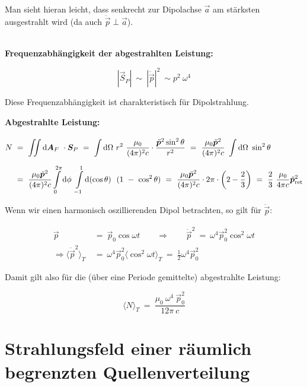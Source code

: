 Man sieht hieran leicht, dass senkrecht zur Dipolachse $\vec{a}$ am stärksten ausgestrahlt wird (da auch $\ddot{\vec{p}}\perp \vec{a}$).

\ \\
\textbf{Frequenzabhängigkeit der abgestrahlten Leistung:}

\begin{equation*}
|\vec{S}_P|  \ \sim \ |\ddot{\vec{p}}|^2 \ \sim p^2 \ \omega^4
\end{equation*}

Diese Frequenzabhängigkeit ist charakteristisch für Dipolstrahlung.

\newpage
\textbf{Abgestrahlte Leistung:}

\begin{align*}
N  \ &= \ \Iint{}{}{\vec{A}_F} \cdot \vec{S}_P  \ = \ \Int{}{}{\Omega}r^2 \ \frac{\mu_0}{(4\pi)^2c}\cdot\frac{\ddot{\vec{p}}^2\sin^2\theta}{r^2}  \ = \ \frac{\mu_0\ddot{\vec{p}}^2}{(4\pi)^2c} \ \Int{}{}{\Omega}\sin^2\theta\\
&= \ \frac{\mu_0\ddot{\vec{p}}^2}{(4\pi)^2c} \Int{0}{2\pi}{\phi}\Int{-1}{1}{(\cos\theta)} \ (1 \ - \ \cos^2\theta) \ = \ \frac{\mu_0\ddot{\vec{p}}^2}{(4\pi)^2c} \cdot 2\pi \cdot \left(2-\frac{2}{3}\right) \ = \ \frac{2}{3} \ \frac{\mu_0}{4\pi c} \ddot{\vec{p}}^2_{\text{ret}}
\end{align*}

Wenn wir einen harmonisch oszillierenden Dipol betrachten, so gilt für $\ddot{\vec{p}}$:

\begin{align*}
\vec{p}  \ &= \ \vec{p}_0 \cos\omega t \qquad \Rightarrow \qquad \ddot{\vec{p}}^2  \ = \ \omega^4\vec{p}_0^2\cos^2\omega t\\
\Rightarrow \langle\ddot{\vec{p}}^2\rangle_T  \ &= \  \omega^4\vec{p}_0^2 \langle\cos^2\omega t\rangle_T  \ = \ \frac{1}{2} \omega^4 \vec{p}_0^2
\end{align*}

Damit gilt also für die (über eine Periode gemittelte) abgestrahlte Leistung:

\begin{equation*}
\langle N \rangle_T  \ = \  \frac{\mu_0 \ \omega^4\ \vec{p}_0^2}{12\pi \ c}
\end{equation*}

\section{Strahlungsfeld einer räumlich begrenzten Quellenverteilung}

